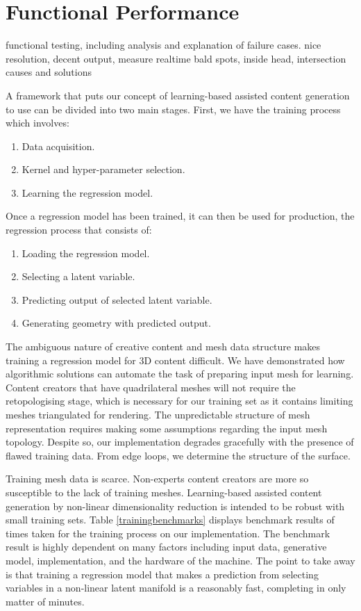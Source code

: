 \documentclass[ %
author={Dillon Keith Diep},
supervisor={Dr. Carl Henrik Ek},
degree={MEng},
title={ART-CG:},
subtitle={Assisted Real-time Content Generation of 3D Hair by Learning Manifolds},
type={Research},
year={2017} ]{dissertation}
\begin{document}
\section{Functional Performance}
{\color{red}
	functional  testing, including analysis and explanation of failure cases.
	nice resolution, decent output, measure realtime
	bald spots, inside head, intersection 
	causes and solutions
}

A framework that puts our concept of learning-based assisted content generation to use can be divided into two main stages. First, we have the training process which involves:
\begin{enumerate}
	\item Data acquisition.
	\item Kernel and hyper-parameter selection.
	\item Learning the regression model.
\end{enumerate}
Once a regression model has been trained, it can then be used for production, the regression process that consists of:
\begin{enumerate}
	\item Loading the regression model.
	\item Selecting a latent variable.
	\item Predicting output of selected latent variable.
	\item Generating geometry with predicted output.
\end{enumerate}

The ambiguous nature of creative content and mesh data structure makes training a regression model for 3D content difficult. We have demonstrated how algorithmic solutions can automate the task of preparing input mesh for learning. Content creators that have quadrilateral meshes will not require the retopologising stage, which is necessary for our training set as it contains limiting meshes triangulated for rendering. The unpredictable structure of mesh representation requires making some assumptions regarding the input mesh topology. Despite so, our implementation degrades gracefully with the presence of flawed training data. From edge loops, we determine the structure of the surface.

Training mesh data is scarce. Non-experts content creators are more so susceptible to the lack of training meshes. Learning-based assisted content generation by non-linear dimensionality reduction is intended to be robust with small training sets. Table \ref{trainingbenchmarks} displays benchmark results of times taken for the training process on our implementation. The benchmark result is highly dependent on many factors including input data, generative model, implementation, and the hardware of the machine. The point to take away is that training a regression model that makes a prediction from selecting variables in a non-linear latent manifold is a reasonably fast, completing in only matter of minutes.
\end{document}
